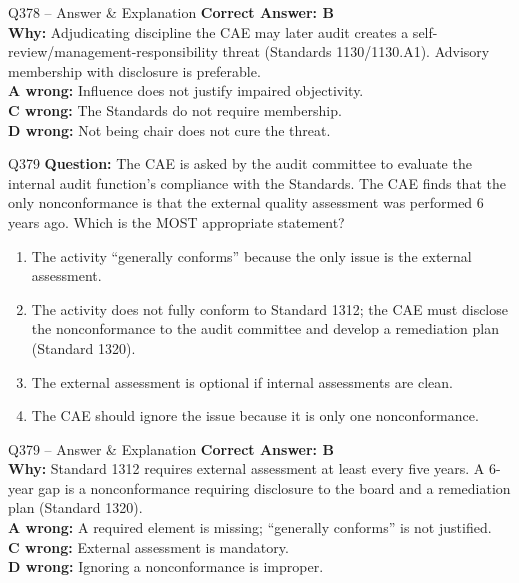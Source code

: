 \documentclass[aspectratio=169,10pt]{beamer}
\begin{document}
	\begin{frame}[t]{Q378 -- Answer \& Explanation}
		\small
		\textbf{Correct Answer: B} \\[4pt]
		\textbf{Why:} Adjudicating discipline the CAE may later audit creates a self-review/management-responsibility threat (Standards 1130/1130.A1). Advisory membership with disclosure is preferable. \\[4pt]
		\textbf{A wrong:} Influence does not justify impaired objectivity. \\[2pt]
		\textbf{C wrong:} The Standards do not require membership. \\[2pt]
		\textbf{D wrong:} Not being chair does not cure the threat.
	\end{frame}
	
	\begin{frame}[t]{Q379}
		\small
		\textbf{Question:} The CAE is asked by the audit committee to evaluate the internal audit function's compliance with the Standards. The CAE finds that the only nonconformance is that the external quality assessment was performed 6 years ago. Which is the MOST appropriate statement?
		\begin{enumerate}[label=\Alph*.,itemsep=1pt,topsep=2pt]
			\item The activity ``generally conforms'' because the only issue is the external assessment.
			\item The activity does not fully conform to Standard 1312; the CAE must disclose the nonconformance to the audit committee and develop a remediation plan (Standard 1320).
			\item The external assessment is optional if internal assessments are clean.
			\item The CAE should ignore the issue because it is only one nonconformance.
		\end{enumerate}
	\end{frame}
	
	\begin{frame}[t]{Q379 -- Answer \& Explanation}
		\small
		\textbf{Correct Answer: B} \\[4pt]
		\textbf{Why:} Standard 1312 requires external assessment at least every five years. A 6-year gap is a nonconformance requiring disclosure to the board and a remediation plan (Standard 1320). \\[4pt]
		\textbf{A wrong:} A required element is missing; ``generally conforms'' is not justified. \\[2pt]
		\textbf{C wrong:} External assessment is mandatory. \\[2pt]
		\textbf{D wrong:} Ignoring a nonconformance is improper.
	\end{frame}
	
\end{document}
